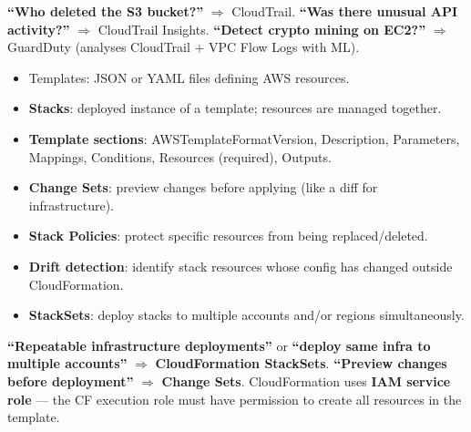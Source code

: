 \begin{examtip}
\textbf{``Who deleted the S3 bucket?''} $\Rightarrow$ CloudTrail.
\textbf{``Was there unusual API activity?''} $\Rightarrow$ CloudTrail Insights.
\textbf{``Detect crypto mining on EC2?''} $\Rightarrow$ GuardDuty (analyses CloudTrail + VPC Flow Logs with ML).
\end{examtip}



\begin{keyfacts}
\begin{itemize}
  \item Templates: JSON or YAML files defining AWS resources.
  \item \textbf{Stacks}: deployed instance of a template; resources are managed together.
  \item \textbf{Template sections}: AWSTemplateFormatVersion, Description, Parameters,
        Mappings, Conditions, Resources (required), Outputs.
  \item \textbf{Change Sets}: preview changes before applying (like a diff for infrastructure).
  \item \textbf{Stack Policies}: protect specific resources from being replaced/deleted.
  \item \textbf{Drift detection}: identify stack resources whose config has changed
        outside CloudFormation.
  \item \textbf{StackSets}: deploy stacks to multiple accounts and/or regions simultaneously.
\end{itemize}
\end{keyfacts}

\begin{examtip}
\textbf{``Repeatable infrastructure deployments''} or \textbf{``deploy same infra to multiple accounts''}
$\Rightarrow$ \textbf{CloudFormation StackSets}.
\textbf{``Preview changes before deployment''} $\Rightarrow$ \textbf{Change Sets}.
CloudFormation uses \textbf{IAM service role} --- the CF execution role must have permission
to create all resources in the template.
\end{examtip}

